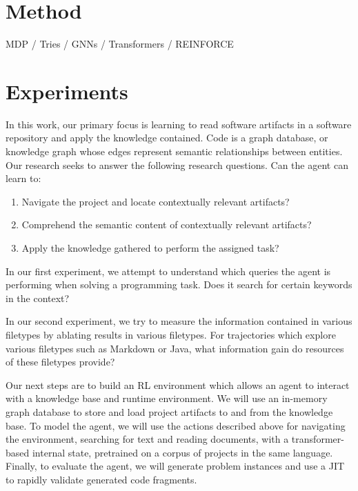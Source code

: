 \documentclass[11pt]{article}
\begin{document}
\section{Method}

MDP / Tries / GNNs / Transformers / REINFORCE

\section{Experiments}

In this work, our primary focus is learning to read software artifacts in a software repository and apply the knowledge contained. Code is a graph database, or knowledge graph whose edges represent semantic relationships between entities. Our research seeks to answer the following research questions. Can the agent can learn to:

\begin{enumerate}
  \item Navigate the project and locate contextually relevant artifacts?
  \item Comprehend the semantic content of contextually relevant artifacts?
  \item Apply the knowledge gathered to perform the assigned task?
\end{enumerate}

In our first experiment, we attempt to understand which queries the agent is performing when solving a programming task. Does it search for certain keywords in the context?

In our second experiment, we try to measure the information contained in various filetypes by ablating results in various filetypes. For trajectories which explore various filetypes such as Markdown or Java, what information gain do resources of these filetypes provide?

Our next steps are to build an RL environment which allows an agent to interact with a knowledge base and runtime environment. We will use an in-memory graph database to store and load project artifacts to and from the knowledge base. To model the agent, we will use the actions described above for navigating the environment, searching for text and reading documents, with a transformer-based internal state, pretrained on a corpus of projects in the same language. Finally, to evaluate the agent, we will generate problem instances and use a JIT to rapidly validate generated code fragments.

  
  
\end{document}
